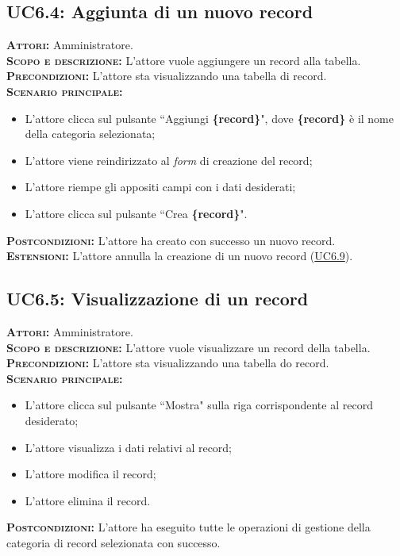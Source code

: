 \subsection{UC6.4: Aggiunta di un nuovo record}
\label{sec:UC64}
\textsc{\textbf{Attori:}} Amministratore.\\
\textsc{\textbf{Scopo e descrizione:}} L'attore vuole aggiungere un record alla tabella.\\
\textsc{\textsc{\textbf{Precondizioni:}}} L'attore sta visualizzando una tabella di record.\\
\textsc{\textbf{Scenario principale:}} 
\begin{itemize}
    \item L'attore clicca sul pulsante ``Aggiungi \textbf{\{record\}}", dove \textbf{\{record\}} è il nome della categoria selezionata;
    \item L'attore viene reindirizzato al \textit{form} di creazione del record;
    \item L'attore riempe gli appositi campi con i dati desiderati;
    \item L'attore clicca sul pulsante ``Crea \textbf{\{record\}}".
\end{itemize}
\textsc{\textbf{Postcondizioni:}} L'attore ha creato con successo un nuovo record.\\
\textsc{\textbf{Estensioni:}} L'attore annulla la creazione di un nuovo record (\hyperref[sec:UC69]{UC6.9}).

\subsection{UC6.5: Visualizzazione di un record}
\label{sec:UC65}
\textsc{\textbf{Attori:}} Amministratore.\\
\textsc{\textbf{Scopo e descrizione:}} L'attore vuole visualizzare un record della tabella.\\
\textsc{\textsc{\textbf{Precondizioni:}}} L'attore sta visualizzando una tabella do record.\\
\textsc{\textbf{Scenario principale:}} 
\begin{itemize}
    \item L'attore clicca sul pulsante ``Mostra" sulla riga corrispondente al record desiderato;
    \item L'attore visualizza i dati relativi al record;
    \item L'attore modifica il record;
    \item L'attore elimina il record.
\end{itemize}
\textsc{\textbf{Postcondizioni:}} L'attore ha eseguito tutte le operazioni di gestione della categoria di record selezionata con successo.

